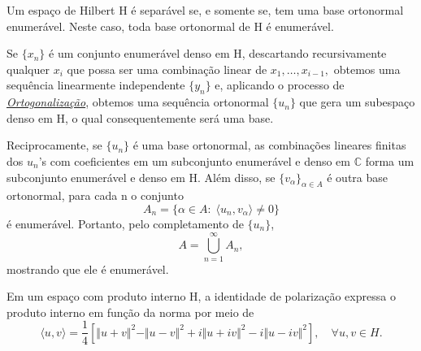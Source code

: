 \documentclass[../functional_analysis.tex]{subfiles}
\begin{document}
\begin{theorem*}
	Um espaço de Hilbert H é separável se, e somente se, tem uma base ortonormal enumerável. Neste caso, toda base ortonormal de H é enumerável.
\end{theorem*}
\begin{proof*}
	Se \(\{x_{n}\}\) é um conjunto enumerável denso em H, descartando recursivamente qualquer \(x_{i}\) que possa ser uma combinação linear de \(x_1,\dotsc ,x_{i-1},\) obtemos uma sequência linearmente independente \(\{y_{n}\}\) e, aplicando o processo de \hyperlink{gram_schmidt}{\textit{Ortogonalização}}, obtemos uma sequência ortonormal \(\{u_{n}\}\) que gera um subespaço denso em H, o qual consequentemente será uma base.

	Reciprocamente, se \(\{u_{n}\}\) é uma base ortonormal, as combinações lineares finitas dos \(u_{n}\)'s com coeficientes em um subconjunto enumerável e denso em \(\mathbb{C}\) forma um subconjunto enumerável e denso em H. Além disso, se \(\{v_{\alpha }\}_{\alpha \in A}\) é outra base ortonormal, para cada n o conjunto
	\[
		A_{n}=\{\alpha \in A:\; \langle u_{n}, v_{\alpha } \rangle\neq 0\}
	\]
	é enumerável. Portanto, pelo completamento de \(\{u_{n}\}\),
	\[
		A = \bigcup_{n=1}^{\infty}A_{n},
	\]
	mostrando que ele é enumerável. \qedsymbol
\end{proof*}
Em um espaço com produto interno H, a identidade de polarização expressa o produto interno em função da norma por meio de
\[
	\langle u, v \rangle = \frac{1}{4}[\Vert u+v \Vert^{2} - \Vert u-v \Vert^{2} + i \Vert u+iv \Vert^{2} - i \Vert u-iv \Vert^{2}],\quad \forall u, v\in H.
\]
\end{document}
